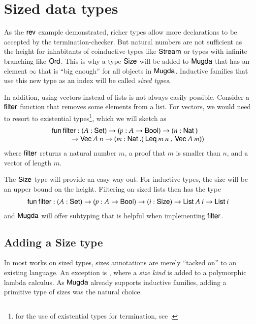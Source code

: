 \chapter{Sized data types}

As the $\mathsf{rev}$ example demonstrated, richer types allow more declarations to be accepted by the termination-checker. 
But natural numbers are not sufficient as the height for inhabitants of coinductive types like $\mathsf{Stream}$ or types with infinite branching like $\mathsf{Ord}$.
This is why a type $\mathsf{Size}$ will be added to $\textsf{Mugda}$ that has an element $\infty$ that is ``big enough'' for all objects in $\textsf{Mugda}$.
Inductive families that use this new type as an index will be called \emph{sized types}. 

In addition, using vectors instead of lists is not always easily possible.
Consider a $\mathsf{filter}$ function that removes some elements from a list.
For vectors, we would need to resort to existential types\footnote{for the use of existential types for termination, see \cite{xi99dependent}.}, which we will sketch as
\[ \begin{array}{l} 
\fun \filter : (A : \Set ) \ra (p : A \ra \Bool ) \ra (n : \Nat ) \\
\spcx \ra \vVec A \: n \ra (m : \Nat . (\: \tLeq m \: n \:, \: \vVec A \: m))
\end{array}\]   
where  $\mathsf{filter}$ returns a natural number $m$, a proof that $m$ is smaller than $n$, and a vector of length $m$.

The $\mathsf{Size}$ type will provide an easy way out. For inductive types, the size will be an upper bound 
on the height. Filtering on sized lists then has the type 
\[
\begin{array}{l} 
\mathsf{fun}\: \mathsf{filter} : (A : \mathsf{Set} ) \rightarrow (p : A \rightarrow \mathsf{Bool} ) \rightarrow (i : \mathsf{Size} ) \rightarrow \mathsf{List}\: A \: i \rightarrow \mathsf{List}\: i 
\end{array}   
\]
and $\textsf{Mugda}$ will offer subtyping that is helpful when implementing $\mathsf{filter}$.

\section{Adding a Size type}

In most works on sized types, sizes annotations are merely ``tacked on'' to an existing language. An exception is \cite{abel:PhD}, where a \emph{size kind} is added to a polymorphic lambda calculus. 
As $\textsf{Mugda}$ already supports inductive families, adding a primitive type of sizes was the natural choice. 

